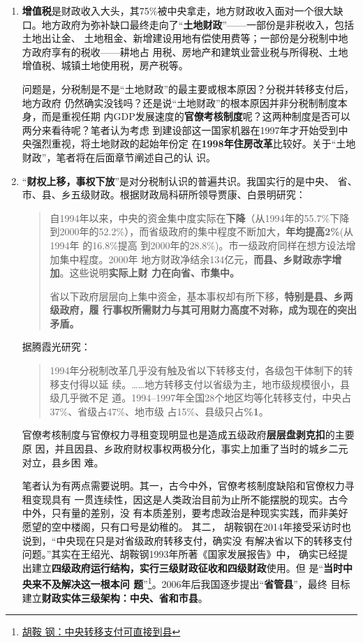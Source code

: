 \begin{enumerate}
\item \textbf{增值税}是财政收入大头，其75\%被中央拿走，地方财政收入面对一个很大缺
  口。地方政府为弥补缺口最终走向了“\textbf{土地财政}”——一部份是非税收入，包括土地出让金、
  土地租金、新增建设用地有偿使用费等；一部份是分税制中地方政府享有的税收——耕地占
  用税、房地产和建筑业营业税与所得税、土地增值税、城镇土地使用税，房产税等。

  问题是，分税制是不是“土地财政”的最主要或根本原因？分税并转移支付后，地方政府
  仍然确实没钱吗？还是说“土地财政”的根本原因并非分税制制度本身，而是重视任期
  内GDP发展速度的\textbf{官僚考核制度}呢？这两种制度是否可以两分来看待呢？笔者认为考虑
  到建设部这一国家机器在1997年才开始受到中央强烈重视，将土地财政的起始年份定
  在\textbf{1998年住房改革}比较好。关于“土地财政”，笔者将在后面章节阐述自己的认
  识。

\item “\textbf{财权上移，事权下放}”是对分税制认识的普遍共识。我国实行的是中央、
  省、市、县、乡五级财政。根据财政局科研所领导贾康、白景明研究：
  \begin{quotation}
    自1994年以来，中央的资金集中度实际在\textbf{下降}（从1994年的55.7\%下降
    到2000年的52.2\%），而省级政府的集中程度不断加大，\textbf{年均提高2\%}(从1994年
    的16.8\%提高 到2000年的28.8\%)。市一级政府同样在想方设法增加集中程度。2000年
    地方财政净结余134亿元，\textbf{而县、乡财政赤字增加}。这些说明\textbf{实际上财
      力在向省、市集中。}\cite{xianxiangfenshui}

    省以下政府层层向上集中资金，基本事权却有所下移，\textbf{特别是县、乡两级政府，履
      行事权所需财力与其可用财力高度不对称，成为现在的突出矛盾。}
  \end{quotation}

  据腾霞光研究：
  \begin{quotation}
    1994年分税制改革几乎没有触及省以下转移支付，各级包干体制下的转移支付得以延
    续。……地方转移支付以省级为主，地市级规模很小，县级几乎微不足
    道。1994--1997年全国28个地区均等化转移支付，中央占37\%、省级占47\%、地市级
    占15\%、县级只占\textbf{\%1}。
  \end{quotation}

  官僚考核制度与官僚权力寻租变现明显也是造成五级政府\textbf{层层盘剥克扣}的主要原
  因，并且因县、乡政府财权事权两极分化，事实上加重了当时的城乡二元对立，县乡困
  难。

  笔者认为有两点需要说明。其一，古今中外，官僚考核制度缺陷和官僚权力寻租变现具有
  一贯连续性，因这是人类政治目前为止所不能摆脱的现实。古今中外，只有量的差别，没
  有本质差别，要考虑政治是种现实实践，而非美好愿望的空中楼阁，只有口号是幼稚的。
  其二， 胡鞍钢在2014年接受采访时也说到，“中央现在只是对省级政府转移支付，确实没
  有解决省以下的转移支付问题。”其实在王绍光、胡鞍钢1993年所著《国家发展报告》中，
  确实已经提出建立\textbf{四级政府运行结构，实行三级财政征收和四级财政}使用。但
  是“\textbf{当时中央来不及解决这一根本问
    题}”\footnote{\href{http://business.sohu.com/20140428/n398892838.shtml}{胡鞍
      钢：中央转移支付可直接到县}}。2006年后我国逐步提出“\textbf{省管县}”，最终
  目标建立\textbf{财政实体三级架构：中央、省和市县}。


\end{enumerate}
